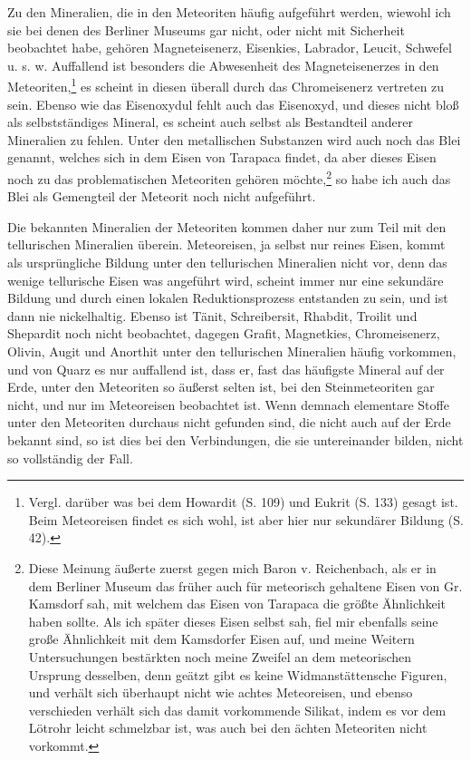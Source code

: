 \documentclass[a4paper, 11pt, oneside]{article}
\begin{document}
Zu den Mineralien, die in den Meteoriten häufig aufgeführt werden, wiewohl ich sie bei denen des Berliner Museums gar nicht, oder nicht mit Sicherheit beobachtet habe, gehören Magneteisenerz, Eisenkies, Labrador, Leucit, Schwefel u. s. w. Auffallend ist besonders die Abwesenheit des Magneteisenerzes in den Meteoriten,\footnote{Vergl. darüber was bei dem Howardit (S. 109) und Eukrit (S. 133) gesagt ist. Beim Meteoreisen findet es sich wohl, ist aber hier nur sekundärer Bildung (S. 42).} es scheint in diesen überall durch das Chromeisenerz vertreten zu sein. Ebenso wie das Eisenoxydul fehlt auch das Eisenoxyd, und dieses nicht bloß als selbstständiges Mineral, es scheint auch selbst als Bestandteil anderer Mineralien zu fehlen. Unter den metallischen Substanzen wird auch noch das Blei genannt, welches sich in dem Eisen von Tarapaca findet, da aber dieses Eisen noch zu das problematischen Meteoriten gehören möchte,\footnote{Diese Meinung äußerte zuerst gegen mich Baron v. Reichenbach, als er in dem Berliner Museum das früher auch für meteorisch gehaltene Eisen von Gr. Kamsdorf sah, mit welchem das Eisen von Tarapaca die größte Ähnlichkeit haben sollte. Als ich später dieses Eisen selbst sah, fiel mir ebenfalls seine große Ähnlichkeit mit dem Kamsdorfer Eisen auf, und meine Weitern Untersuchungen bestärkten noch meine Zweifel an dem meteorischen Ursprung desselben, denn geätzt gibt es keine Widmanstättensche Figuren, und verhält sich überhaupt nicht wie achtes Meteoreisen, und ebenso verschieden verhält sich das damit vorkommende Silikat, indem es vor dem Lötrohr leicht schmelzbar ist, was auch bei den ächten Meteoriten nicht vorkommt.} so habe ich auch das Blei als Gemengteil der Meteorit noch nicht aufgeführt.

Die bekannten Mineralien der Meteoriten kommen daher nur zum Teil mit den tellurischen Mineralien überein. Meteoreisen, ja selbst nur reines Eisen, kommt als ursprüngliche Bildung unter den tellurischen Mineralien nicht vor, denn das wenige tellurische Eisen was angeführt wird, scheint immer nur eine sekundäre Bildung und durch einen lokalen Reduktionsprozess entstanden zu sein, und ist dann nie nickelhaltig. Ebenso ist Tänit, Schreibersit, Rhabdit, Troilit und Shepardit noch nicht beobachtet, dagegen Grafit, Magnetkies, Chromeisenerz, Olivin, Augit und Anorthit unter den tellurischen Mineralien häufig vorkommen, und von Quarz es nur auffallend ist, dass er, fast das häufigste Mineral auf der Erde, unter den Meteoriten so äußerst selten ist, bei den Steinmeteoriten gar nicht, und nur im Meteoreisen beobachtet ist. Wenn demnach elementare Stoffe unter den Meteoriten durchaus nicht gefunden sind, die nicht auch auf der Erde bekannt sind, so ist dies bei den Verbindungen, die sie untereinander bilden, nicht so vollständig der Fall.
\end{document}
